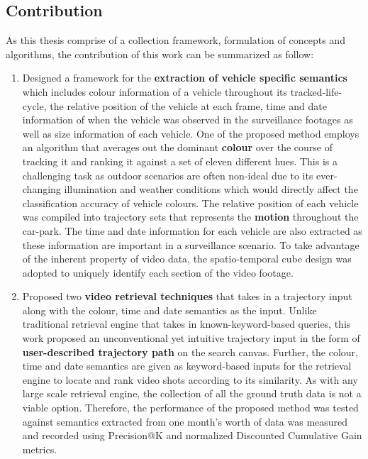\subsection{Contribution}
As this thesis comprise of a collection framework, formulation of concepts and algorithms, the contribution of this work can be summarized as follow:


\begin{enumerate}
\item Designed a framework for the \textbf{extraction of vehicle specific semantics} which includes colour information of a vehicle throughout its tracked-life-cycle, the relative position of the vehicle at each frame, time and date information of when the vehicle was observed in the surveillance footages as well as size information of each vehicle. One of the proposed method employs an algorithm that averages out the dominant \textbf{colour} over the course of tracking it and ranking it against a set of eleven different hues. This is a challenging task as outdoor scenarios are often non-ideal due to its ever-changing illumination and weather conditions which would directly affect the classification accuracy of vehicle colours. The relative position of each vehicle was compiled into trajectory sets that represents the \textbf{motion} throughout the car-park. The time and date information for each vehicle are also extracted as these information are important in a surveillance scenario. To take advantage of the inherent property of video data, the spatio-temporal cube design was adopted to uniquely identify each section of the video footage.
\item Proposed two \textbf{video retrieval techniques} that takes in a trajectory input along with the colour, time and date semantics as the input. Unlike traditional retrieval engine that takes in known-keyword-based queries, this work proposed an unconventional yet intuitive trajectory input in the form of \textbf{user-described trajectory path} on the search canvas. Further, the colour, time and date semantics are given as keyword-based inputs for the retrieval engine to locate and rank video shots according to its similarity. As with any large scale retrieval engine, the collection of all the ground truth data is not a viable option. Therefore, the performance of the proposed method was tested against semantics extracted from one month's worth of data was measured and recorded using Precision@K and normalized Discounted Cumulative Gain metrics.
\end{enumerate}

